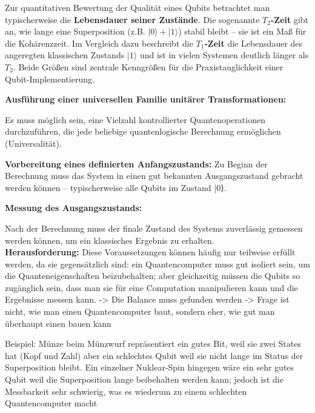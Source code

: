 Zur quantitativen Bewertung der Qualität eines Qubits betrachtet man typischerweise die \textbf{Lebensdauer seiner Zustände}. Die sogenannte \textbf{$T_2$-Zeit} gibt an, wie lange eine Superposition (z.B. 
$|0\rangle+|1\rangle$) 
stabil bleibt – sie ist ein Maß für die Kohärenzzeit. Im Vergleich dazu beschreibt die \textbf{$T_1$-Zeit} die Lebensdauer des angeregten klassischen Zustands $|1\rangle$ 
und ist in vielen Systemen deutlich länger als $T_2$. Beide Größen sind zentrale Kenngrößen für die Praxistauglichkeit einer Qubit-Implementierung.\\


 
 
    \item \textbf{Ausführung einer universellen Familie unitärer Transformationen:}

 Es muss möglich sein, eine Vielzahl kontrollierter Quantenoperationen durchzuführen, die jede beliebige quantenlogische Berechnung ermöglichen (Universalität).\\
 
    \item \textbf{Vorbereitung eines definierten Anfangszustands:}
 Zu Beginn der Berechnung muss das System in einen gut bekannten Ausgangszustand gebracht werden können – typischerweise alle Qubits im Zustand |0⟩.\\

    \item \textbf{Messung des Ausgangszustands:}

 Nach der Berechnung muss der finale Zustand des Systems zuverlässig gemessen werden können, um ein klassisches Ergebnis zu erhalten. \\

\textbf{Herausforderung: }
Diese Voraussetzungen können häufig nur teilweise erfüllt werden, da sie gegensätzlich sind: ein Quantencomputer muss gut isoliert sein, um die Quanteneigenschaften beizubehalten; aber gleichzeitig müssen die Qubits so zugänglich sein, dass man sie für eine Computation manipulieren kann und die Ergebnisse messen kann. 
-> Die Balance muss gefunden werden
-> Frage ist nicht, wie man einen Quantencomputer baut, sondern eher, wie gut man überhaupt einen bauen kann

Beispiel: Münze beim Münzwurf repräsentiert ein gutes Bit, weil sie zwei States hat (Kopf und Zahl) aber ein schlechtes Qubit weil sie nicht lange im Status der Superposition bleibt. Ein einzelner Nuklear-Spin hingegen wäre ein sehr gutes Qubit weil die Superposition lange beibehalten werden kann; jedoch ist die Messbarkeit sehr schwierig, was es wiederum zu einem schlechten Quantencomputer macht \\

